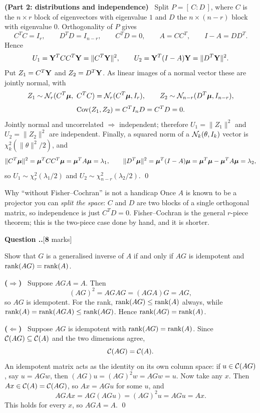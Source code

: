 \documentclass[11pt]{article}
\newcounter{qq}[section]
\newcommand{\qhead}[2]{\medskip\refstepcounter{qq}%
  \noindent\textbf{\color{Blue}Question \thesection.\theqq.}\hfill\textnormal{[\textbf{#1} marks]}%
  \ifx\relax#2\relax\else\par\smallskip\fi}
\newcommand{\pt}[1]{\smallskip\noindent\textbf{(#1)}\ }
\begin{document}
\pt{Part 2: distributions and independence} Split
$P=[\,C:D\,]$, where $C$ is the $n\times r$ block of eigenvectors with eigenvalue $1$ and $D$
the $n\times(n-r)$ block with eigenvalue $0$. Orthogonality of $P$ gives
\[
  C^TC=I_r,\qquad D^TD=I_{n-r},\qquad C^TD=0,\qquad A=CC^T,\qquad I-A=DD^T .
\]
Hence
\[
  U_1=\mathbf{Y}^TCC^T\mathbf{Y}=\|C^T\mathbf{Y}\|^2,
  \qquad
  U_2=\mathbf{Y}^T(I-A)\mathbf{Y}=\|D^T\mathbf{Y}\|^2 .
\]
Put $Z_1=C^T\mathbf{Y}$ and $Z_2=D^T\mathbf{Y}$. As linear images of a normal vector these are jointly
normal, with
\[
  Z_1\sim\mathcal{N}_r(C^T\boldsymbol{\mu},\ C^TC)=\mathcal{N}_r(C^T\boldsymbol{\mu},I_r),
  \qquad
  Z_2\sim\mathcal{N}_{n-r}(D^T\boldsymbol{\mu},I_{n-r}),
\]
\[
  \operatorname{Cov}(Z_1,Z_2)=C^TI_nD=C^TD=0 .
\]
Jointly normal and uncorrelated $\Longrightarrow$ independent; therefore
$U_1=\|Z_1\|^2$ and $U_2=\|Z_2\|^2$ are independent. Finally, a squared norm of a
$\mathcal{N}_k(\theta,I_k)$ vector is $\chi^2_k(\|\theta\|^2/2)$, and
\[
  \|C^T\boldsymbol{\mu}\|^2=\boldsymbol{\mu}^TCC^T\boldsymbol{\mu}=\boldsymbol{\mu}^TA\boldsymbol{\mu}=\lambda_1,
  \qquad
  \|D^T\boldsymbol{\mu}\|^2=\boldsymbol{\mu}^T(I-A)\boldsymbol{\mu}=\boldsymbol{\mu}^T\boldsymbol{\mu}-\boldsymbol{\mu}^TA\boldsymbol{\mu}=\lambda_2 ,
\]
so $U_1\sim\chi^2_r(\lambda_1/2)$ and $U_2\sim\chi^2_{n-r}(\lambda_2/2)$. \qed

\begin{idea}{Why ``without Fisher--Cochran'' is not a handicap}
Once $A$ is known to be a projector you can \emph{split the space}: $C$ and $D$ are two
blocks of a single orthogonal matrix, so independence is just $C^TD=0$. Fisher--Cochran is
the general $r$-piece theorem; this is the two-piece case done by hand, and it is shorter.
\end{idea}

\qhead{8}{}
\begin{stmt}
Show that $G$ is a generalised inverse of $A$ if and only if $AG$ is idempotent and
$\operatorname{rank}(AG)=\operatorname{rank}(A)$.
\end{stmt}

\pt{$\Rightarrow$} Suppose $AGA=A$. Then
\[
  (AG)^2=AGAG=(AGA)G=AG,
\]
so $AG$ is idempotent. For the rank, $\operatorname{rank}(AG)\le\operatorname{rank}(A)$ always, while
$\operatorname{rank}(A)=\operatorname{rank}(AGA)\le\operatorname{rank}(AG)$. Hence $\operatorname{rank}(AG)=\operatorname{rank}(A)$.

\pt{$\Leftarrow$} Suppose $AG$ is idempotent with $\operatorname{rank}(AG)=\operatorname{rank}(A)$. Since
$\mathcal{C}(AG)\subseteq\mathcal{C}(A)$ and the two dimensions agree,
\[
  \mathcal{C}(AG)=\mathcal{C}(A).
\]
An idempotent matrix acts as the identity on its own column space: if $u\in\mathcal{C}(AG)$, say
$u=AGw$, then $(AG)u=(AG)^2w=AGw=u$. Now take any $x$. Then $Ax\in\mathcal{C}(A)=\mathcal{C}(AG)$, so
$Ax=AGu$ for some $u$, and
\[
  AGAx=AG(AGu)=(AG)^2u=AGu=Ax .
\]
This holds for every $x$, so $AGA=A$. \qed
\end{document}
